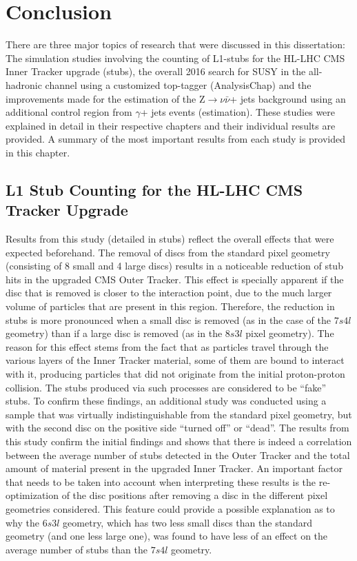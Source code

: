\chapter{Conclusion}\label{ch:conclusion}

There are three major topics of research that were discussed in this dissertation: The simulation studies involving the counting of L1-stubs for the HL-LHC CMS Inner Tracker upgrade ({stubs}), the overall 2016 search for SUSY in the all-hadronic channel using a customized top-tagger ({AnalysisChap}) and the improvements made for the estimation of the Z$\rightarrow \nu\bar{\nu}$+ jets background using an additional control region from $\gamma$+ jets events ({estimation}). These studies were explained in detail in their respective chapters and their individual results are provided. A summary of the most important results from each study is provided in this chapter.

\section{L1 Stub Counting for the HL-LHC CMS Tracker Upgrade}

Results from this study (detailed in {stubs}) reflect the overall effects that were expected beforehand. The removal of discs from the standard pixel geometry (consisting of 8 small and 4 large discs) results in a noticeable reduction of stub hits in the upgraded CMS Outer Tracker. This effect is specially apparent if the disc that is removed is closer to the interaction point, due to the much larger volume of particles that are present in this region. Therefore, the reduction in stubs is more pronounced when a small disc is removed (as in the case of the $7s4l$ geometry) than if a large disc is removed (as in the $8s3l$ pixel geometry). The reason for this effect stems from the fact that as particles travel through the various layers of the Inner Tracker material, some of them are bound to interact with it, producing particles that did not originate from the initial proton-proton collision. The stubs produced via such processes are considered to be ``fake'' stubs. To confirm these findings, an additional study was conducted using a sample that was virtually indistinguishable from the standard pixel geometry, but with the second disc on the positive side ``turned off'' or ``dead''. The results from this study confirm the initial findings and shows that there is indeed a correlation between the average number of stubs detected in the Outer Tracker and the total amount of material present in the upgraded Inner Tracker. An important factor that needs to be taken into account when interpreting these results is the re-optimization of the disc positions after removing a disc in the different pixel geometries considered. This feature could provide a possible explanation as to why the $6s3l$ geometry, which has two less small discs than the standard geometry (and one less large one), was found to have less of an effect on the average number of stubs than the $7s4l$ geometry.

